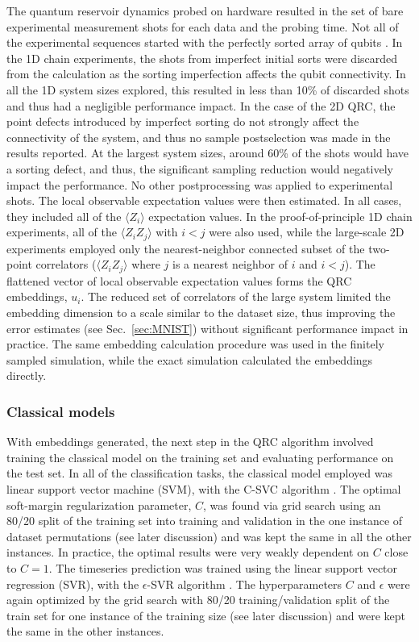 \documentclass[english,floatfix,twocolumn,showpacs, aps, prx, reprint, superscriptaddress, longbibliography]{revtex4-2}
\begin{document}
The quantum reservoir dynamics probed on hardware resulted in the set of bare experimental measurement shots for each data and the probing time. Not all of the experimental sequences started with the perfectly sorted array of qubits \cite{Wurtz2023}. In the 1D chain experiments, the shots from imperfect initial sorts were discarded from the calculation as the sorting imperfection affects the qubit connectivity. In all the 1D system sizes explored, this resulted in less than 10\% of discarded shots and thus had a negligible performance impact. In the case of the 2D QRC, the point defects introduced by imperfect sorting do not strongly affect the connectivity of the system, and thus no sample postselection was made in the results reported. At the largest system sizes, around 60\% of the shots would have a sorting defect, and thus, the significant sampling reduction would negatively impact the performance. No other postprocessing was applied to experimental shots. The local observable expectation values were then estimated. In all cases, they included all of the $\langle Z_i \rangle$ expectation values. In the proof-of-principle 1D chain experiments, all of the $\langle Z_i Z_j \rangle$ with $i<j$ were also used, while the large-scale 2D experiments employed only the nearest-neighbor connected subset of the two-point correlators ($\langle Z_i Z_j \rangle$ where $j$ is a nearest neighbor of $i$ and $i<j$). The flattened vector of local observable expectation values forms the QRC embeddings, $u_i$. The reduced set of correlators of the large system limited the embedding dimension to a scale similar to the dataset size, thus improving the error estimates (see Sec.~\ref{sec:MNIST}) without significant performance impact in practice. The same embedding calculation procedure was used in the finitely sampled simulation, while the exact simulation calculated the embeddings directly.


\subsubsection{Classical models}

With embeddings generated, the next step in the QRC algorithm involved training the classical model on the training set and evaluating performance on the test set. In all of the classification tasks, the classical model employed was linear support vector machine (SVM), with the C-SVC algorithm \cite{Libsvm2011}. The optimal soft-margin regularization parameter, $C$, was found via grid search using an 80/20 split of the training set into training and validation in the one instance of dataset permutations (see later discussion) and was kept the same in all the other instances. In practice, the optimal results were very weakly dependent on $C$ close to $C=1$. The timeseries prediction was trained using the linear support vector regression (SVR), with the $\epsilon$-SVR algorithm \cite{Libsvm2011}. The hyperparameters $C$ and $\epsilon$ were again optimized by the grid search with 80/20 training/validation split of the train set for one instance of the training size (see later discussion) and were kept the same in the other instances.
\end{document}
